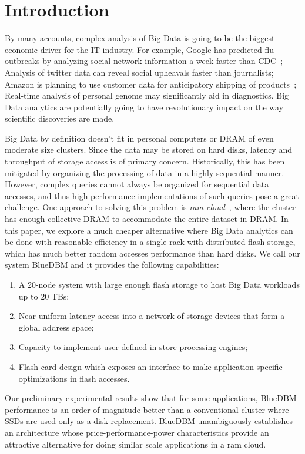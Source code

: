 
\section{Introduction}
\label{sec:intro}
By many accounts, complex analysis of Big Data is going to be the biggest
economic driver for the IT industry. For example, Google has predicted flu
outbreaks by analyzing social network information a week faster than
CDC~\cite{googleflu}; Analysis of twitter data can reveal social upheavals
faster than journalists; Amazon is planning to use customer data for
anticipatory
shipping of products~\cite{amazonanticipatory}; Real-time analysis of personal genome may significantly
aid in diagnostics. Big Data analytics are potentially going to have
revolutionary impact on the way scientific discoveries are made. 

Big Data by definition doesn’t fit in personal computers or DRAM of even
moderate size clusters. Since the data may be stored on hard disks, latency and
throughput of storage access is of primary concern. Historically, this has been
mitigated by organizing the processing of data in a highly sequential manner.
However, complex queries cannot always be organized for sequential data
accesses, and thus high performance implementations of such queries pose a great
challenge. One approach to solving this problem is \emph{ram
cloud}~\cite{ramcloud}, where the cluster has enough collective DRAM to
accommodate the entire dataset in DRAM.  In this paper, we explore a much
cheaper alternative where Big Data analytics can be done with reasonable
efficiency in a single rack with distributed flash storage, which has much
better random accesses performance than hard disks.  We call our system
BlueDBM and it provides the following capabilities:

\begin{enumerate}
\item A 20-node system with large enough flash storage to host Big Data
workloads up to 20 TBs;
\item Near-uniform latency access into a network of storage devices that form a global address space;
\item Capacity to implement user-defined in-store processing engines;
\item Flash card design which exposes an interface to make application-specific optimizations in flash accesses.
\end{enumerate}

Our preliminary experimental results show that for some applications, BlueDBM
performance is an order of magnitude better than a conventional cluster where
SSDs are used only as a disk replacement. BlueDBM unambiguously establishes
an architecture whose price-performance-power characteristics provide an
attractive alternative for doing similar scale applications in a ram cloud.

